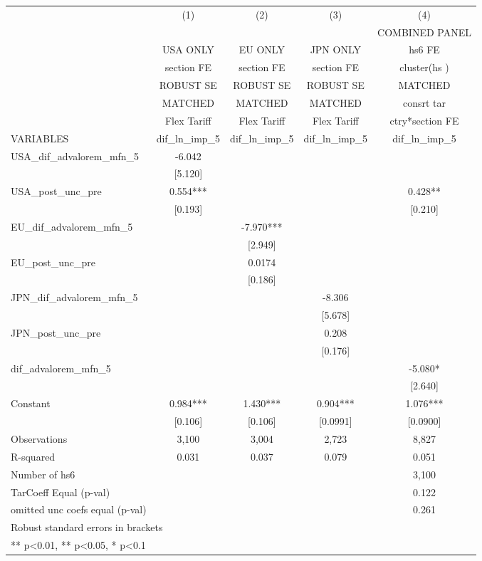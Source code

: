 \begin{tabular}{lcccc}
\toprule
 & (1) & (2) & (3) & (4) \\
 &  &  &  & COMBINED PANEL \\
 & USA ONLY & EU ONLY & JPN ONLY & hs6 FE \\
 & section FE & section FE & section FE & cluster(hs ) \\
 & ROBUST SE & ROBUST SE & ROBUST SE & MATCHED \\
 & MATCHED & MATCHED & MATCHED & consrt tar \\
 & Flex Tariff & Flex Tariff & Flex Tariff & ctry*section FE \\
VARIABLES & dif\_ln\_imp\_5 & dif\_ln\_imp\_5 & dif\_ln\_imp\_5 & dif\_ln\_imp\_5 \\
\midrule
USA\_dif\_advalorem\_mfn\_5 & -6.042 &  &  &  \\
 & [5.120] &  &  &  \\
USA\_post\_unc\_pre & 0.554*** &  &  & 0.428** \\
 & [0.193] &  &  & [0.210] \\
EU\_dif\_advalorem\_mfn\_5 &  & -7.970*** &  &  \\
 &  & [2.949] &  &  \\
EU\_post\_unc\_pre &  & 0.0174 &  &  \\
 &  & [0.186] &  &  \\
JPN\_dif\_advalorem\_mfn\_5 &  &  & -8.306 &  \\
 &  &  & [5.678] &  \\
JPN\_post\_unc\_pre &  &  & 0.208 &  \\
 &  &  & [0.176] &  \\
dif\_advalorem\_mfn\_5 &  &  &  & -5.080* \\
 &  &  &  & [2.640] \\
Constant & 0.984*** & 1.430*** & 0.904*** & 1.076*** \\
 & [0.106] & [0.106] & [0.0991] & [0.0900] \\
\midrule
Observations & 3,100 & 3,004 & 2,723 & 8,827 \\
R-squared & 0.031 & 0.037 & 0.079 & 0.051 \\
Number of hs6 &  &  &  & 3,100 \\
TarCoeff Equal (p-val) &  &  &  & 0.122 \\
omitted unc coefs equal (p-val) &  &  &  & 0.261 \\
\bottomrule
\multicolumn{5}{l}{\footnotesize Robust standard errors in brackets} \\
\multicolumn{5}{l}{\footnotesize *** p<0.01, ** p<0.05, * p<0.1} \\
\end{tabular}
